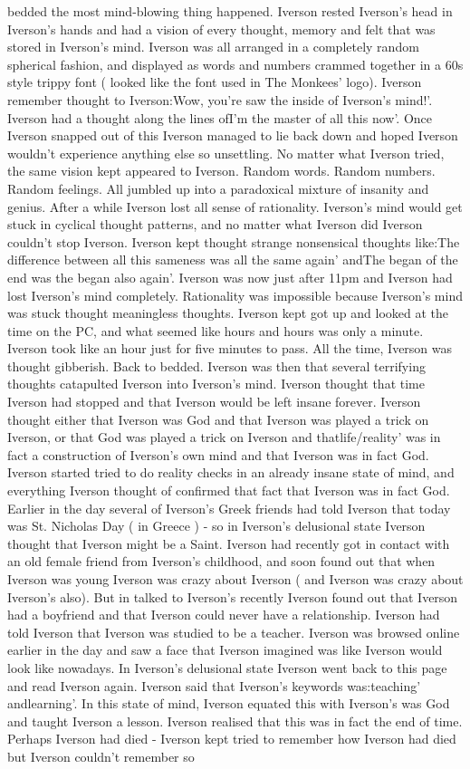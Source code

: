 \documentclass[12pt]{book}
\begin{document}
bedded the most mind-blowing thing happened. Iverson rested Iverson's head in Iverson's hands and had a vision of every thought, memory and felt that was stored in Iverson's mind. Iverson was all arranged in a completely random spherical fashion, and displayed as words and numbers crammed together in a 60s style trippy font ( looked like the font used in The Monkees' logo). Iverson remember thought to Iverson:Wow, you're saw the inside of Iverson's mind!'. Iverson had a thought along the lines ofI'm the master of all this now'. Once Iverson snapped out of this Iverson managed to lie back down and hoped Iverson wouldn't experience anything else so unsettling. No matter what Iverson tried, the same vision kept appeared to Iverson. Random words. Random numbers. Random feelings. All jumbled up into a paradoxical mixture of insanity and genius. After a while Iverson lost all sense of rationality. Iverson's mind would get stuck in cyclical thought patterns, and no matter what Iverson did Iverson couldn't stop Iverson. Iverson kept thought strange nonsensical thoughts like:The difference between all this sameness was all the same again' andThe began of the end was the began also again'. Iverson was now just after 11pm and Iverson had lost Iverson's mind completely. Rationality was impossible because Iverson's mind was stuck thought meaningless thoughts. Iverson kept got up and looked at the time on the PC, and what seemed like hours and hours was only a minute. Iverson took like an hour just for five minutes to pass. All the time, Iverson was thought gibberish. Back to bedded. Iverson was then that several terrifying thoughts catapulted Iverson into Iverson's mind. Iverson thought that time Iverson had stopped and that Iverson would be left insane forever. Iverson thought either that Iverson was God and that Iverson was played a trick on Iverson, or that God was played a trick on Iverson and thatlife/reality' was in fact a construction of Iverson's own mind and that Iverson was in fact God. Iverson started tried to do reality checks in an already insane state of mind, and everything Iverson thought of confirmed that fact that Iverson was in fact God. Earlier in the day several of Iverson's Greek friends had told Iverson that today was St. Nicholas Day ( in Greece ) - so in Iverson's delusional state Iverson thought that Iverson might be a Saint. Iverson had recently got in contact with an old female friend from Iverson's childhood, and soon found out that when Iverson was young Iverson was crazy about Iverson ( and Iverson was crazy about Iverson's also). But in talked to Iverson's recently Iverson found out that Iverson had a boyfriend and that Iverson could never have a relationship. Iverson had told Iverson that Iverson was studied to be a teacher. Iverson was browsed online earlier in the day and saw a face that Iverson imagined was like Iverson would look like nowadays. In Iverson's delusional state Iverson went back to this page and read Iverson again. Iverson said that Iverson's keywords was:teaching' andlearning'. In this state of mind, Iverson equated this with Iverson's was God and taught Iverson a lesson. Iverson realised that this was in fact the end of time. Perhaps Iverson had died - Iverson kept tried to remember how Iverson had died but Iverson couldn't remember so 
\end{document}
